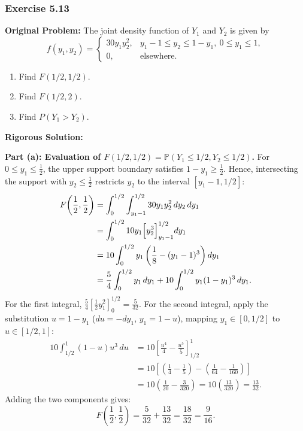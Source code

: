 \documentclass[11pt, letterpaper]{article}
\theoremstyle{definition}
\theoremstyle{remark}
\begin{document}
\bigskip

\subsubsection*{Exercise 5.13}
\textbf{Original Problem:} The joint density function of $Y_1$ and $Y_2$ is given by
\[
    f(y_1, y_2) = \begin{cases}
        30 y_1 y_2^2, & y_1 - 1 \le y_2 \le 1 - y_1,\ 0 \le y_1 \le 1, \\
        0, & \text{elsewhere.}
    \end{cases}
\]
\begin{enumerate}[label=\textbf{\alph*}]
    \item Find $F(1/2, 1/2)$.
    \item Find $F(1/2, 2)$.
    \item Find $P(Y_1 > Y_2)$.
\end{enumerate}

\textbf{Rigorous Solution:}

\textbf{Part (a): Evaluation of $F(1/2, 1/2) = \mathbb{P}(Y_1 \le 1/2, Y_2 \le 1/2)$.}
For $0 \le y_1 \le \frac{1}{2}$, the upper support boundary satisfies $1 - y_1 \ge \frac{1}{2}$. Hence, intersecting the support with $y_2 \le \frac{1}{2}$ restricts $y_2$ to the interval $[y_1 - 1, 1/2]$:
\begin{align*}
    F\!\left(\frac{1}{2}, \frac{1}{2}\right) &= \int_{0}^{1/2} \int_{y_1 - 1}^{1/2} 30 y_1 y_2^2 \, dy_2 \, dy_1 \\
    &= \int_{0}^{1/2} 10 y_1 \Bigl[ y_2^3 \Bigr]_{y_1 - 1}^{1/2} dy_1 \\
    &= 10 \int_{0}^{1/2} y_1 \left( \frac{1}{8} - (y_1 - 1)^3 \right) dy_1 \\
    &= \frac{5}{4} \int_{0}^{1/2} y_1 \, dy_1 + 10 \int_{0}^{1/2} y_1 (1 - y_1)^3 \, dy_1.
\end{align*}
For the first integral, $\frac{5}{4} \left[\frac{1}{2}y_1^2\right]_0^{1/2} = \frac{5}{32}$. For the second integral, apply the substitution $u = 1 - y_1$ ($du = -dy_1$, $y_1 = 1 - u$), mapping $y_1 \in [0, 1/2]$ to $u \in [1/2, 1]$:
\begin{align*}
    10 \int_{1/2}^{1} (1 - u) u^3 \, du &= 10 \left[ \frac{u^4}{4} - \frac{u^5}{5} \right]_{1/2}^{1} \\
    &= 10 \left[ \left( \frac{1}{4} - \frac{1}{5} \right) - \left( \frac{1}{64} - \frac{1}{160} \right) \right] \\
    &= 10 \left( \frac{1}{20} - \frac{3}{320} \right) = 10 \left( \frac{13}{320} \right) = \frac{13}{32}.
\end{align*}
Adding the two components gives:
\[
    F\!\left(\frac{1}{2}, \frac{1}{2}\right) = \frac{5}{32} + \frac{13}{32} = \frac{18}{32} = \frac{9}{16}.
\]
\end{document}
